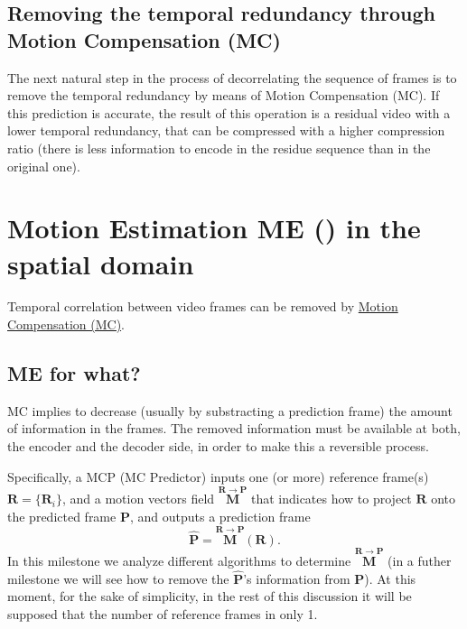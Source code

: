 \subsection{Removing the temporal redundancy through Motion Compensation (MC)}
The next natural step in the process of decorrelating the sequence of
frames is to remove the temporal redundancy by means of Motion
Compensation (MC).  If this prediction is accurate, the result of this
operation is a residual video with a lower temporal redundancy, that
can be compressed with a higher compression ratio (there is
less information to encode in the residue sequence than in the
original one).



\section{Motion Estimation ME () in the spatial domain}

Temporal correlation between video frames can be removed by
\href{https://en.wikipedia.org/wiki/Motion_compensation}{Motion
  Compensation
  (MC)}. 

\subsection{ME for what?}
 MC implies to decrease (usually by substracting a
prediction frame) the amount of information in the frames. The removed
information must be available at both, the encoder and the decoder
side, in order to make this a reversible process.

Specifically, a MCP (MC Predictor) inputs one (or more) reference
frame(s) ${\mathbf R}=\{{\mathbf R}_i\}$, and a motion vectors field
$\overset{{\mathbf R}\rightarrow{\mathbf P}}{\mathbf M}$ that
indicates how to project ${\mathbf R}$ onto the predicted frame ${\mathbf P}$, and outputs
a prediction frame
\begin{equation}
  \hat{{\mathbf P}} =  \overset{{\mathbf R}\rightarrow {\mathbf P}}{\mathbf M}({\mathbf R}).
  \label{eq:MCP1}
\end{equation}
In this milestone we analyze different algorithms to determine
$\overset{{\mathbf R}\rightarrow {\mathbf P}}{\mathbf M}$ (in a futher
milestone we will see how to remove the $\hat{{\mathbf P}}$'s
information from ${\mathbf P}$). At this moment, for the sake of
simplicity, in the rest of this discussion it will be supposed that the
number of reference frames in only 1.

